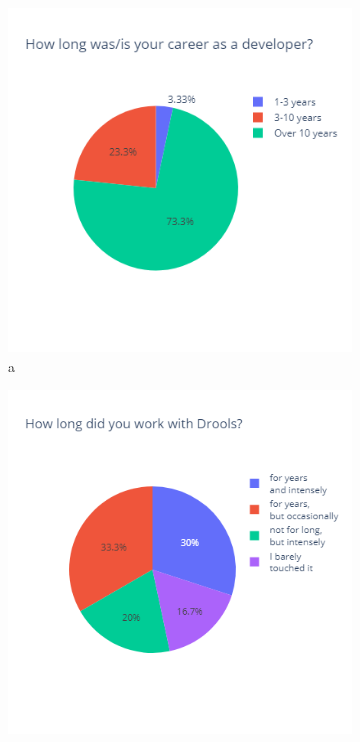 \begin{figure}[H]
    \begin{subfigure}{.33\textwidth}
      \centering
      \includegraphics[width=.95\linewidth]{Sections/images/pie_experiencer.png}
      \caption{a}
      \label{fig:sfig1}
    \end{subfigure}%
    \begin{subfigure}{.33\textwidth}
      \centering
      \includegraphics[width=.95\linewidth]{Sections/images/pie_droolsExperience.png}

\end{subfigure}
\end{figure}
